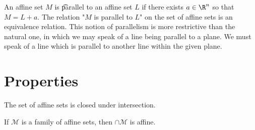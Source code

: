 An affine set $M$ is \t{parallel} to an affine set $L$ if there exists $a \in \R ^n$ so that $M = L + a$.
The relation "$M$ is parallel to $L$" on the set of affine sets is an equivalence relation.
This notion of parallelism is more restrictive than the natural one, in which we may speak of a line being parallel to a plane.
We must speak of a line which is parallel to another line within the given plane.

\section*{Properties}

The set of affine sets is closed under intersection.
\begin{proposition}
If $\mathcal{M}$ is a family of affine sets, then $\cap \mathcal{M}$ is affine.
\end{proposition}

\blankpage